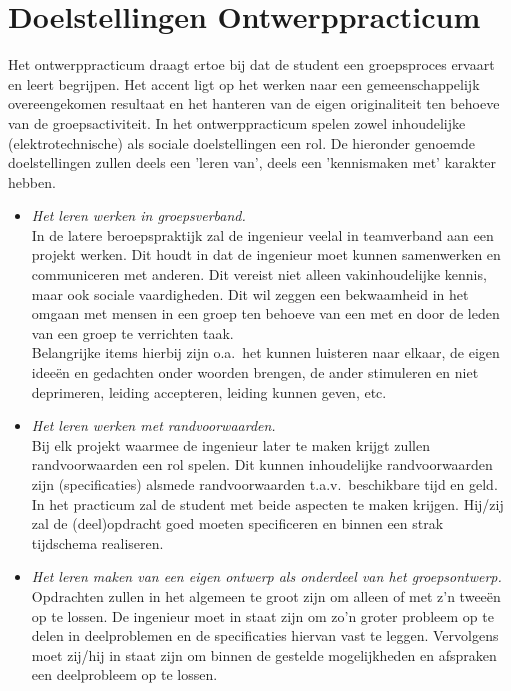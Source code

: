 \section{Doelstellingen Ontwerppracticum}

Het ontwerppracticum draagt ertoe bij dat de student een groepsproces
ervaart en leert begrijpen. Het accent ligt op het werken naar een
gemeenschappelijk overeengekomen resultaat en het hanteren van de eigen
originaliteit ten behoeve van de groepsactiviteit.
In het ontwerppracticum spelen zowel inhoudelijke (elektrotechnische)
als sociale doelstellingen een rol. De hieronder genoemde doelstellingen
zullen deels een 'leren van', deels een 'kennismaken met' karakter hebben.
\begin{itemize}
\item
{\it Het leren werken in groepsverband.}\\
In de latere beroepspraktijk zal de ingenieur veelal in teamverband aan
een projekt werken. Dit houdt in dat de ingenieur moet kunnen
samenwerken en communiceren met anderen. Dit vereist niet alleen
vakinhoudelijke kennis, maar ook sociale vaardigheden. Dit wil zeggen
een bekwaamheid in het omgaan met mensen in een groep ten behoeve van
een met en door de leden van een groep te verrichten taak. \\
Belangrijke items hierbij zijn o.a.\ het kunnen luisteren naar elkaar, de
eigen idee\"en en gedachten onder woorden brengen, de ander stimuleren
en niet deprimeren, leiding accepteren, leiding kunnen geven, etc.
\item
{\it Het leren werken met randvoorwaarden.}\\
Bij elk projekt waarmee de ingenieur later te maken krijgt zullen
randvoorwaarden een rol spelen. Dit kunnen inhoudelijke randvoorwaarden
zijn (specificaties) alsmede randvoorwaarden t.a.v.\ beschikbare tijd en
geld. In het practicum zal de student met beide aspecten te maken
krijgen. Hij/zij zal de (deel)opdracht goed moeten specificeren en
binnen een strak tijdschema realiseren.
\item
{\it Het leren maken van een eigen ontwerp als onderdeel van het
groepsontwerp.}\\
Opdrachten zullen in het algemeen te groot zijn om alleen of met z'n
twee\"en op te lossen. De ingenieur moet in staat zijn om zo'n groter
probleem op te delen in deelproblemen en de specificaties hiervan vast
te leggen. Vervolgens moet zij/hij in staat zijn om binnen de gestelde
mogelijkheden en afspraken een deelprobleem op te lossen.\\

\end{itemize}
